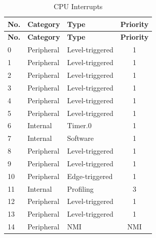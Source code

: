  \begin{longtable}[c]{ |l|l|l|c| } 

    \caption{CPU Interrupts}
    \label{tab:CPU-interrupt}\\
    \hline
    \rowcolor{lightgray}
   \textbf{No.} & \textbf{Category}     & \textbf{Type}              & \textbf{Priority}    \\
    \hline
    \endfirsthead
    
    \hline
    \rowcolor{lightgray}
   \textbf{No.} & \textbf{Category}     & \textbf{Type}              & \textbf{Priority}    \\
    \hline
    \endhead
    
    \endfoot
    
    \hline
    \endlastfoot
    
    0   & Peripheral    & Level-triggered   & 1                 \\
    \hline
    1   & Peripheral    & Level-triggered   & 1                 \\
    \hline
    2   & Peripheral    & Level-triggered   & 1                 \\
    \hline
    3   & Peripheral    & Level-triggered   & 1                 \\
    \hline
    4   & Peripheral    & Level-triggered   & 1                 \\
    \hline
    5   & Peripheral    & Level-triggered   & 1                 \\
    \hline
    6   & Internal      & Timer.0           & 1                 \\
    \hline
    7   & Internal      & Software          & 1                 \\
    \hline
    8   & Peripheral    & Level-triggered   & 1                 \\
    \hline
    9   & Peripheral    & Level-triggered   & 1                 \\
    \hline
    10  & Peripheral    & Edge-triggered    & 1                 \\
    \hline
    11  & Internal      & Profiling         & 3                 \\
    \hline
    12  & Peripheral    & Level-triggered   & 1                 \\
    \hline
    13  & Peripheral    & Level-triggered   & 1                 \\
    \hline
    14  & Peripheral    & NMI               & NMI               \\
    \hline

\end{longtable}
